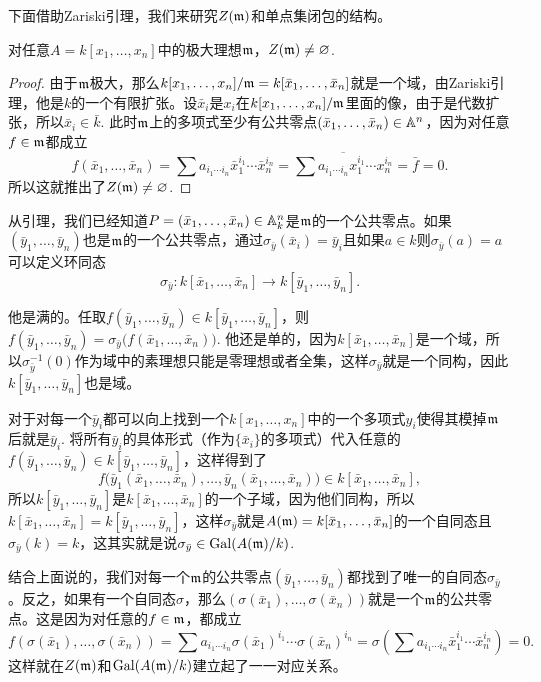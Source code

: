 下面借助Zariski引理，我们来研究$Z(\mathfrak{m})$和单点集闭包的结构。

\begin{lem}
    对任意$A=k[x_1,\dots,x_n]$中的极大理想$\mathfrak{m}$，$Z(\mathfrak{m})\neq\varnothing$.
\end{lem}

\begin{proof} 
    由于$\mathfrak{m}$极大，那么$k[x_1,\dots,x_n]/\mathfrak{m}=k[\bar{x}_1,\dots,\bar{x}_n]$就是一个域，由Zariski引理，他是$k$的一个有限扩张。设$\bar{x}_i$是$x_i$在$k[x_1,\dots,x_n]/\mathfrak{m}$里面的像，由于是代数扩张，所以$\bar{x}_i\in \bar{k}$. 此时$\mathfrak{m}$上的多项式至少有公共零点$(\bar{x}_1,\dots,\bar{x}_n)\in \mathbb{A}^n$，因为对任意$f\in \mathfrak{m}$都成立
    \[
        f(\bar{x}_1,\dots,\bar{x}_n)=\sum a_{i_1\cdots i_n} {\bar{x}}_1^{i_1}\cdots {\bar{x}}_n^{i_n}=\overline{\sum a_{i_1\cdots i_n} x_1^{i_1}\cdots x_n^{i_n}}=\bar{f}=0.
    \]
    所以这就推出了$Z(\mathfrak{m})\neq\varnothing$.
\end{proof}

从引理，我们已经知道$P=(\bar{x}_1,\dots,\bar{x}_n)\in \mathbb{A}^n_k$是$\mathfrak{m}$的一个公共零点。如果$(\bar{y}_1,\dots,\bar{y}_n)$也是$\mathfrak{m}$的一个公共零点，通过$\sigma_{\bar{y}}(\bar{x}_i)=\bar{y}_i$且如果$a\in k$则$\sigma_{\bar{y}}(a)=a$可以定义环同态
\[
    \sigma_{\bar{y}}:k[\bar{x}_1,\dots,\bar{x}_n]\to k[\bar{y}_1,\dots,\bar{y}_n].
\]

他是满的。任取$f(\bar{y}_1,\dots,\bar{y}_n)\in k[\bar{y}_1,\dots,\bar{y}_n]$，则$f(\bar{y}_1,\dots,\bar{y}_n)=\sigma_{\bar{y}}\bigl(f(\bar{x}_1,\dots,\bar{x}_n)\bigr)$.
他还是单的，因为$k[\bar{x}_1,\dots,\bar{x}_n]$是一个域，所以$\sigma_{\bar{y}}^{-1}(0)$作为域中的素理想只能是零理想或者全集，这样$\sigma_{\bar{y}}$就是一个同构，因此$k[\bar{y}_1,\dots,\bar{y}_n]$也是域。

对于对每一个$\bar{y}_i$都可以向上找到一个$k[x_1,\dots,x_n]$中的一个多项式$y_i$使得其模掉$\mathfrak{m}$后就是$\bar{y}_i$.
将所有$\bar{y}_i$的具体形式（作为$\{\bar{x}_i\}$的多项式）代入任意的$f(\bar{y}_1,\dots,\bar{y}_n) \in k[\bar{y}_1,\dots,\bar{y}_n]$，这样得到了
\[
    f\bigl(\bar{y}_1(\bar{x}_1,\dots,\bar{x}_n),\dots,\bar{y}_n(\bar{x}_1,\dots,\bar{x}_n)\bigr) \in k[\bar{x}_1,\dots,\bar{x}_n],
\]
所以$k[\bar{y}_1,\dots,\bar{y}_n]$是$k[\bar{x}_1,\dots,\bar{x}_n]$的一个子域，因为他们同构，所以$k[\bar{x}_1,\dots,\bar{x}_n]=k[\bar{y}_1,\dots,\bar{y}_n]$，这样$\sigma_{\bar{y}}$就是$A(\mathfrak{m})=k[\bar{x}_1,\dots,\bar{x}_n]$的一个自同态且$\sigma_{\bar{y}}(k)=k$，这其实就是说$\sigma_{\bar{y}}\in \operatorname{Gal}(A(\mathfrak{m})/k)$.

结合上面说的，我们对每一个$\mathfrak{m}$的公共零点$(\bar{y}_1,\dots,\bar{y}_n)$都找到了唯一的自同态$\sigma_{\bar{y}}$。反之，如果有一个自同态$\sigma$，那么$(\sigma(\bar{x}_1),\dots,\sigma(\bar{x}_n))$就是一个$\mathfrak{m}$的公共零点。这是因为对任意的$f\in\mathfrak{m}$，都成立
\[
    f(\sigma(\bar{x}_1),\dots,\sigma(\bar{x}_n))=\sum a_{i_1\cdots i_n} \sigma({\bar{x}}_1)^{i_1}\cdots \sigma({\bar{x}}_n)^{i_n}=\sigma\left(\sum a_{i_1\cdots i_n} \bar{x}_1^{i_1}\cdots \bar{x}_n^{i_n}\right)=0.
\]
这样就在$Z(\mathfrak{m})$和$\operatorname{Gal}(A(\mathfrak{m})/k)$建立起了一一对应关系。

